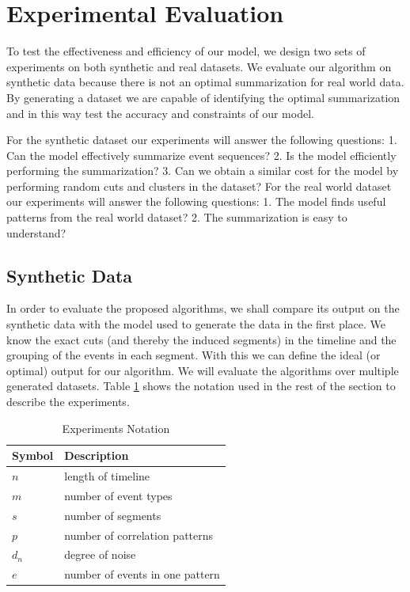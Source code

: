 \section{Experimental Evaluation}
To test the effectiveness and efficiency of our model, we design two sets of experiments on both synthetic and real datasets. We evaluate our algorithm on synthetic data because there is not an optimal summarization for real world data. By generating a dataset we are capable of identifying the optimal summarization and in this way test the accuracy and constraints of our model. 

For the synthetic dataset our experiments will answer the following questions: 1. Can the model effectively summarize event sequences? 2. Is the model efficiently performing the summarization? 3. Can we obtain a similar cost for the model by performing random cuts and clusters in the dataset? For the real world dataset our experiments will answer the following questions: 1. The model finds useful patterns from the real world dataset? 2. The summarization is easy to understand?

\subsection{Synthetic Data}
In order to evaluate the proposed   algorithms, we shall compare its output on the synthetic data with the model used to generate the data in the first place. We know the exact cuts (and thereby the induced segments) in the timeline and the grouping of the events in each segment. With this we can define  the ideal (or optimal) output for our algorithm. We will evaluate the algorithms over multiple generated datasets. Table \ref{tab:expNotation} shows the notation used in the rest of the section to describe the experiments.

\begin{table}[!h]
\centering
    \caption{Experiments Notation}     
    \label{tab:expNotation}
    \begin{small}
    \begin{tabular}{|ll|}
    \hline
    {\bfseries Symbol} & {\bfseries  Description}      \\
    \hline
    $n$ & length of timeline  \\    \hline
     $m$ & number of event types  \\    \hline
     $s$ & number of segments  \\    \hline
      $p$ & number of correlation patterns  \\    \hline
       $d_n$ & degree of noise \\    \hline
        $e$ & number of events in one pattern  \\    \hline
    \end{tabular}
    \end{small} 
\end{table}

